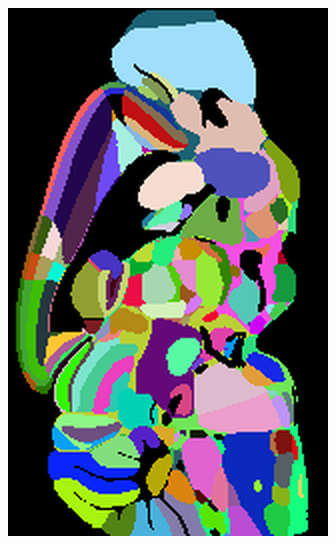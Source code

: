 \documentclass[]{article}
\begin{document}
\begin{figure}
\begin{subfigure}{0.3\textwidth}
		\includegraphics[width=.67\linewidth, angle=270]{../results/random_ano_sagittal_50_res_slice_1.png}
		\caption{}
	\end{subfigure}\\


\end{figure}
\end{document}

